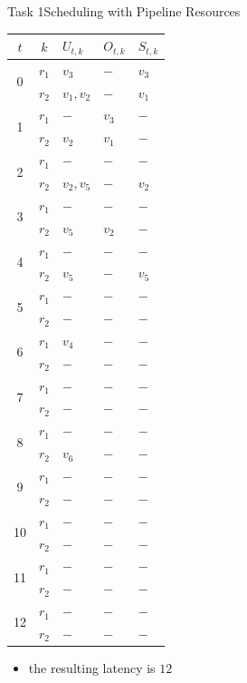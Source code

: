 \begin{frame}{Task 1}{Scheduling with Pipeline Resources}
  \begin{solutionnoinc}
      \centering
      \fontsize{5}{6}\selectfont
      \begin{tabular}{c|c|l|l|l|}
      \hline$t$ & $k$ & $U_{t, k}$ & $O_{t, k}$ & $S_{t, k}$ \\
      \hline \multirow{2}{*}{0} & $r_1$ & $v_3$ & $-$ & $v_3$ \\
      \cline { 2 - 5 } & $r_2$ & $v_1, v_2$ & $-$ & $v_1$ \\
      \hline \multirow{2}{*}{1} & $r_1$ & $-$ & $v_3$ & $-$ \\
      \cline { 2 - 5 } & $r_2$ & $v_2$ & $v_1$ & $-$ \\
      \hline \multirow{2}{*}{2} & $r_1$ & $-$ & $-$ & $-$ \\
      \cline { 2 - 5 } & $r_2$ & $v_2, v_5$ & $-$ & $v_2$ \\
      \hline \multirow{2}{*}{3} & $r_1$ & $-$ & $-$ & $-$ \\
      \cline { 2 - 5 } & $r_2$ & $v_5$ & $v_2$ & $-$ \\
      \hline \multirow{2}{*}{4} & $r_1$ & $-$ & $-$ & $-$ \\
      \cline { 2 - 5 } & $r_2$ & $v_5$ & $-$ & $v_5$ \\
      \hline \multirow{2}{*}{5} & $r_1$ & $-$ & $-$ & $-$ \\
      \cline { 2 - 5 } & $r_2$ & $-$ & $-$ & $-$ \\
      \hline \multirow{2}{*}{6} & $r_1$ & $v_4$ & $-$ & $-$ \\
      \cline { 2 - 5 } & $r_2$ & $-$ & $-$ & $-$ \\
      \hline \multirow{2}{*}{7} & $r_1$ & $-$ & $-$ & $-$ \\
      \cline { 2 - 5 } & $r_2$ & $-$ & $-$ & $-$ \\
      \hline \multirow{2}{*}{8} & $r_1$ & $-$ & $-$ & $-$ \\
      \cline { 2 - 5 } & $r_2$ & $v_6$ & $-$ & $-$ \\
      \hline \multirow{2}{*}{9} & $r_1$ & $-$ & $-$ & $-$ \\
      \cline { 2 - 5 } & $r_2$ & $-$ & $-$ & $-$ \\
      \hline \multirow{2}{*}{10} & $r_1$ & $-$ & $-$ & $-$ \\
      \cline { 2 - 5 } & $r_2$ & $-$ & $-$ & $-$ \\
      \hline \multirow{2}{*}{11} & $r_1$ & $-$ & $-$ & $-$ \\
      \cline { 2 - 5 } & $r_2$ & $-$ & $-$ & $-$ \\
      \hline \multirow{2}{*}{12} & $r_1$ & $-$ & $-$ & $-$ \\
      \cline { 2 - 5 } & $r_2$ & $-$ & $-$ & $-$ \\
      \hline
      \end{tabular}
  \end{solutionnoinc}
\end{frame}
\begin{frame}
  \begin{solutionnoinc}
    \begin{itemize}
      \item the resulting latency is $12$
    \end{itemize}
  \end{solutionnoinc}
\end{frame}
